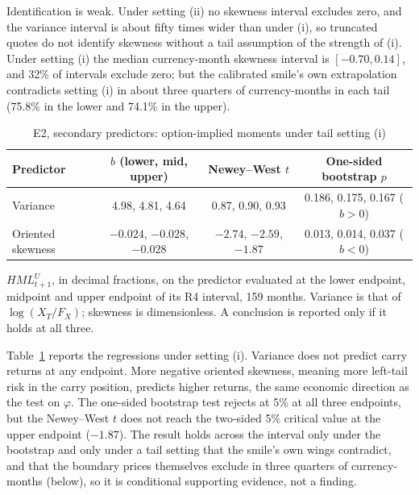 \documentclass[11pt]{article}
\theoremstyle{result}
\newcommand{\HML}{\mathit{HML}}
\begin{document}
Identification is weak. Under setting (ii) no skewness interval excludes zero, and the variance interval is about fifty times wider than under (i), so truncated quotes do not identify skewness without a tail assumption of the strength of (i). Under setting (i) the median currency-month skewness interval is $[-0.70,0.14]$, and 32\% of intervals exclude zero; but the calibrated smile's own extrapolation contradicts setting (i) in about three quarters of currency-months in each tail (75.8\% in the lower and 74.1\% in the upper).

\begin{table}[t]
\centering\small
\caption{E2, secondary predictors: option-implied moments under tail setting (i)}\label{tab:mom}
\begin{tabular}{lccc}
\toprule
Predictor & $b$ (lower, mid, upper) & Newey--West $t$ & One-sided bootstrap $p$ \\
\midrule
Variance & 4.98, 4.81, 4.64 & 0.87, 0.90, 0.93 & 0.186, 0.175, 0.167 ($b>0$) \\
Oriented skewness & $-0.024$, $-0.028$, $-0.028$ & $-2.74$, $-2.59$, $-1.87$ & 0.013, 0.014, 0.037 ($b<0$) \\
\bottomrule
\end{tabular}
\par\medskip
\begin{minipage}{0.97\linewidth}\footnotesize
$\HML^U_{t+1}$, in decimal fractions, on the predictor evaluated at the lower endpoint, midpoint and upper endpoint of its R4 interval, 159 months. Variance is that of $\log(X_T/F_X)$; skewness is dimensionless. A conclusion is reported only if it holds at all three.
\end{minipage}
\end{table}

Table~\ref{tab:mom} reports the regressions under setting (i). Variance does not predict carry returns at any endpoint. More negative oriented skewness, meaning more left-tail risk in the carry position, predicts higher returns, the same economic direction as the test on $\varphi$. The one-sided bootstrap test rejects at 5\% at all three endpoints, but the Newey--West $t$ does not reach the two-sided 5\% critical value at the upper endpoint ($-1.87$). The result holds across the interval only under the bootstrap and only under a tail setting that the smile's own wings contradict, and that the boundary prices themselves exclude in three quarters of currency-months (below), so it is conditional supporting evidence, not a finding.
\end{document}
